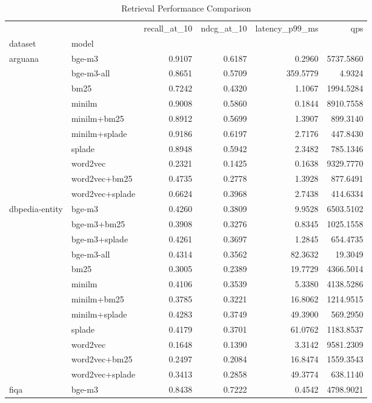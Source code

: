 \begin{table}
\caption{Retrieval Performance Comparison}
\label{tab:main_results}
\begin{tabular}{llrrrr}
\toprule
 &  & recall_at_10 & ndcg_at_10 & latency_p99_ms & qps \\
dataset & model &  &  &  &  \\
\midrule
\multirow[t]{10}{*}{arguana} & bge-m3 & 0.9107 & 0.6187 & 0.2960 & 5737.5860 \\
 & bge-m3-all & 0.8651 & 0.5709 & 359.5779 & 4.9324 \\
 & bm25 & 0.7242 & 0.4320 & 1.1067 & 1994.5284 \\
 & minilm & 0.9008 & 0.5860 & 0.1844 & 8910.7558 \\
 & minilm+bm25 & 0.8912 & 0.5699 & 1.3907 & 899.3140 \\
 & minilm+splade & 0.9186 & 0.6197 & 2.7176 & 447.8430 \\
 & splade & 0.8948 & 0.5942 & 2.3482 & 785.1346 \\
 & word2vec & 0.2321 & 0.1425 & 0.1638 & 9329.7770 \\
 & word2vec+bm25 & 0.4735 & 0.2778 & 1.3928 & 877.6491 \\
 & word2vec+splade & 0.6624 & 0.3968 & 2.7438 & 414.6334 \\
\cline{1-6}
\multirow[t]{12}{*}{dbpedia-entity} & bge-m3 & 0.4260 & 0.3809 & 9.9528 & 6503.5102 \\
 & bge-m3+bm25 & 0.3908 & 0.3276 & 0.8345 & 1025.1558 \\
 & bge-m3+splade & 0.4261 & 0.3697 & 1.2845 & 654.4735 \\
 & bge-m3-all & 0.4314 & 0.3562 & 82.3632 & 19.3049 \\
 & bm25 & 0.3005 & 0.2389 & 19.7729 & 4366.5014 \\
 & minilm & 0.4106 & 0.3539 & 5.3380 & 4138.5286 \\
 & minilm+bm25 & 0.3785 & 0.3221 & 16.8062 & 1214.9515 \\
 & minilm+splade & 0.4283 & 0.3749 & 49.3900 & 569.2950 \\
 & splade & 0.4179 & 0.3701 & 61.0762 & 1183.8537 \\
 & word2vec & 0.1648 & 0.1390 & 3.3142 & 9581.2309 \\
 & word2vec+bm25 & 0.2497 & 0.2084 & 16.8474 & 1559.3543 \\
 & word2vec+splade & 0.3413 & 0.2858 & 49.3774 & 638.1140 \\
\cline{1-6}
\multirow[t]{10}{*}{fiqa} & bge-m3 & 0.8438 & 0.7222 & 0.4542 & 4798.9021 \\

\end{tabular}
\end{table}
